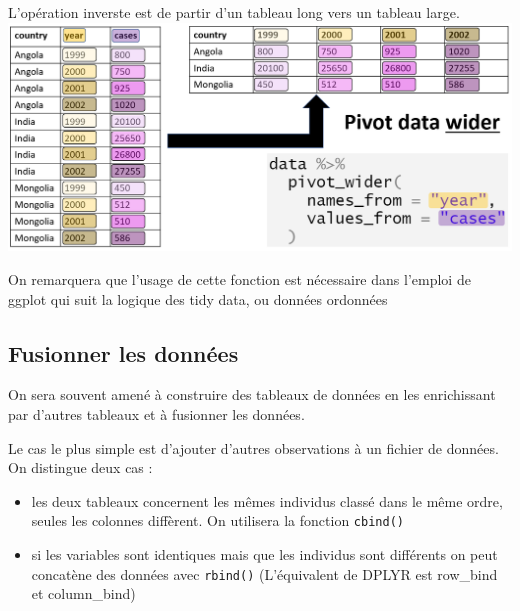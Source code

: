 \documentclass[
]{book}
\providecommand{\tightlist}{%
  \setlength{\itemsep}{0pt}\setlength{\parskip}{0pt}}
\begin{document}
L'opération inverste est de partir d'un tableau long vers un tableau large.
\includegraphics{./Images/pivot_wider.png}

On remarquera que l'usage de cette fonction est nécessaire dans l'emploi de ggplot qui suit la logique des tidy data, ou données ordonnées

\hypertarget{fusionner-les-donnuxe9es}{%
\subsection{Fusionner les données}\label{fusionner-les-donnuxe9es}}

On sera souvent amené à construire des tableaux de données en les enrichissant par d'autres tableaux et à fusionner les données.

Le cas le plus simple est d'ajouter d'autres observations à un fichier de données. On distingue deux cas :

\begin{itemize}
\tightlist
\item
  les deux tableaux concernent les mêmes individus classé dans le même ordre, seules les colonnes diffèrent. On utilisera la fonction \texttt{cbind()}
\item
  si les variables sont identiques mais que les individus sont différents on peut concatène des données avec \texttt{rbind()} (L'équivalent de DPLYR est row\_bind et column\_bind)
\end{itemize}
\end{document}
